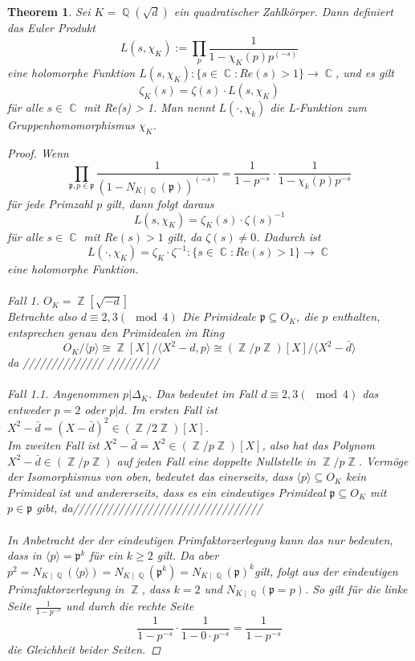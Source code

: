 \documentclass[10pt,a4paper]{article}
\theoremstyle{plain}
\newtheorem{thm}{Theorem}[section]
\theoremstyle{definition}
\theoremstyle{remark}
\DeclareMathOperator{\C}{\mathbb{C}}
\DeclareMathOperator{\Q}{\mathbb{Q}}
\DeclareMathOperator{\Z}{\mathbb{Z}}
\begin{document}
\begin{thm}

\textit{Sei $K=\Q(\sqrt{d})$ ein quadratischer Zahlkörper. Dann definiert das Euler Produkt $$L(s,\chi_K) := \prod_{p}\frac{1}{1-\chi_K(p)p^{(-s)}} $$ eine holomorphe Funktion $L(s,\chi_K) \colon \{s \in \C \colon Re(s) > 1\} \rightarrow \C$, und es gilt $$\zeta_K(s) = \zeta(s)\cdot L(s,\chi_K) $$ für alle }$s \in \C$ mit Re(s) > 1. Man nennt $L(\cdot,\chi_k)$ die \textit{L-Funktion zum Gruppenhomomorphismus $\chi_K$}.

\begin{proof}

Wenn $$\prod_{\mathfrak{p},p \in \mathfrak{p}}\frac{1}{(1- N_{K\mid \Q}(\mathfrak{p}))^{(-s)}}= \frac{1}{1-p^{-s}}\cdot\frac{1}{1-\chi_k(p)p^{-s}}$$ für jede Primzahl $p$ gilt, dann folgt daraus $$L(s,\chi_K)= \zeta_K(s)\cdot \zeta(s)^{-1}$$ für alle $s \in \C$ mit $Re(s)>1$ gilt, da $\zeta(s) \neq 0$. Dadurch ist $$L(\cdot,\chi_K)= \zeta_K\cdot \zeta^{-1}\colon \{s \in \C \colon Re(s)>1\}\rightarrow \C$$ eine holomorphe Funktion.
\\
\\
\textit{Fall 1.}
$O_K= \Z[\sqrt{-d}]$ \\
Betrachte also $d\equiv2,3 (\mod 4)$
Die Primideale $\mathfrak{p} \subseteq O_K$, die $p$ enthalten, entsprechen genau den Primidealen im Ring $$O_K /\langle p\rangle \cong \Z[X] /\langle X^2-d,p\rangle \cong (\Z/p\Z)[X]/\langle X^2-\bar{d}\rangle $$da //////////////
/////////
\\
\\
\textit{Fall 1.1.}
Angenommen $p | \Delta_K$. Das bedeutet im Fall $d \equiv2,3 (\mod 4)$ das entweder $p = 2$ oder $p|d$. Im ersten Fall ist $X^2-\bar{d} = (X-\bar{d})^2 \in (\Z/2\Z)[X]$.
\\
Im zweiten Fall ist $X^2-\bar{d} = X^2 \in (\Z/p\Z)[X]$, also hat das Polynom $X^2-\bar{d} \in (\Z/p\Z)$ auf jeden Fall eine doppelte Nullstelle in $\Z/p\Z$. Vermöge der Isomorphismus von oben, bedeutet das einerseits, dass $\langle p\rangle \subseteq O_K$ kein Primideal ist und andererseits, dass es ein eindeutiges Primideal $\mathfrak{p} \subseteq O_K$ mit $p \in \mathfrak{p}$ gibt, da/////////////////////////////////
\\
\\
In Anbetracht der der eindeutigen Primfaktorzerlegung kann das nur bedeuten, dass in $\langle p\rangle =\mathfrak{p}^k$ für ein $k\geq 2$ gilt. Da aber $p^2=N_{K\mid \Q}(\langle p\rangle)=N_{K\mid \Q}(\mathfrak{p}^k) =N_{K\mid \Q}(\mathfrak{p})^k $gilt, folgt aus der eindeutigen Primzfaktorzerlegung in $\Z$, dass $k = 2$ und $N_{K\mid\Q}(\mathfrak{p}=p)$. So gilt für die linke Seite $\frac{1}{1-p^{-s}}$ und durch die rechte Seite $$\frac{1}{1-p^{-s}}\cdot \frac{1}{1-0\cdot p^{-s}}=\frac{1}{1-p^{-s}}$$ die Gleichheit beider Seiten.

\end{proof}
\end{thm}
\end{document}
